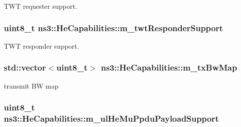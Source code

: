 T\+WT requester support. 

\subsubsection[{\texorpdfstring{m\+\_\+twt\+Responder\+Support}{m_twtResponderSupport}}]{\setlength{\rightskip}{0pt plus 5cm}uint8\+\_\+t ns3\+::\+He\+Capabilities\+::m\+\_\+twt\+Responder\+Support\hspace{0.3cm}{\ttfamily [private]}}\hypertarget{classns3_1_1HeCapabilities_a8a734c713abb42b32e4078c761c605a8}{}\label{classns3_1_1HeCapabilities_a8a734c713abb42b32e4078c761c605a8}


T\+WT responder support. 

\subsubsection[{\texorpdfstring{m\+\_\+tx\+Bw\+Map}{m_txBwMap}}]{\setlength{\rightskip}{0pt plus 5cm}std\+::vector$<$uint8\+\_\+t$>$ ns3\+::\+He\+Capabilities\+::m\+\_\+tx\+Bw\+Map\hspace{0.3cm}{\ttfamily [private]}}\hypertarget{classns3_1_1HeCapabilities_ad6af160216c8873823a05b0961bd3300}{}\label{classns3_1_1HeCapabilities_ad6af160216c8873823a05b0961bd3300}


transmit BW map 

\subsubsection[{\texorpdfstring{m\+\_\+ul\+He\+Mu\+Ppdu\+Payload\+Support}{m_ulHeMuPpduPayloadSupport}}]{\setlength{\rightskip}{0pt plus 5cm}uint8\+\_\+t ns3\+::\+He\+Capabilities\+::m\+\_\+ul\+He\+Mu\+Ppdu\+Payload\+Support\hspace{0.3cm}{\ttfamily [private]}}\hypertarget{classns3_1_1HeCapabilities_a71f3feb98d53dfeca95de2bf08e41443}{}\label{classns3_1_1HeCapabilities_a71f3feb98d53dfeca95de2bf08e41443}


